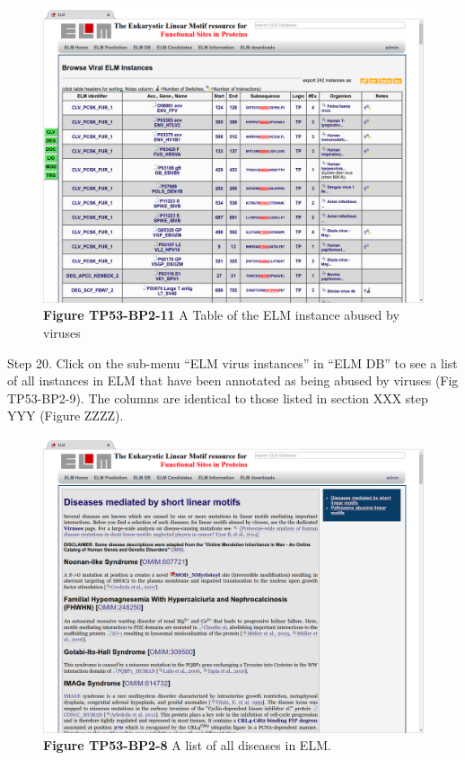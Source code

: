 \begin{figure}[h!]
\centering
\includegraphics[width=\textwidth]{Figures/TP53_2/viruses.png} 
\caption{
\textbf{Figure TP53-BP2-11}
A Table of the ELM instance abused by viruses
}
\end{figure}

Step 20. Click on the sub-menu ``ELM virus instances'' in ``ELM DB'' to
see a list of all instances in ELM that have been annotated as being
abused by viruses (Fig TP53-BP2-9). The columns are identical to those
listed in section XXX step YYY (Figure ZZZZ).


\begin{figure}[h!]
\centering
\includegraphics[width=\textwidth]{Figures/TP53_2/diseases.png}
\caption{
\textbf{Figure TP53-BP2-8}
A list of all diseases in ELM.
}
\end{figure}

